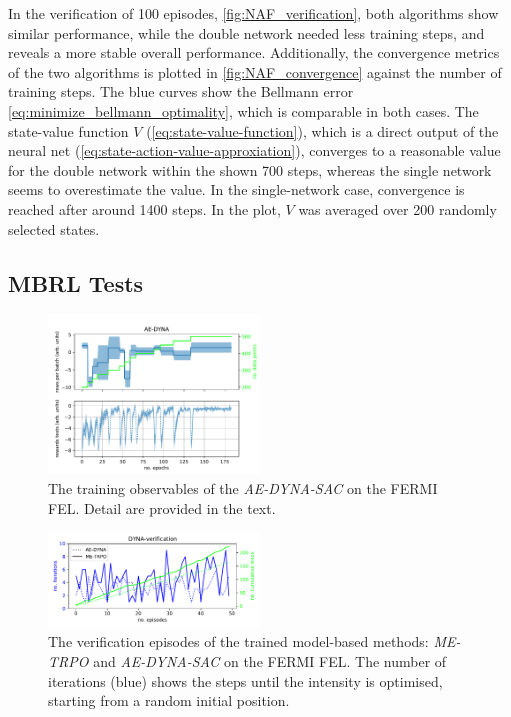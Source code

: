 \documentclass[
reprint,nofootinbib,
amsmath,amssymb,amsfonts,clevref,
aps,
prstab,
]{revtex4-2}
\begin{document}
	In the verification of 100 episodes, \cref{fig:NAF_verification}, both algorithms show similar performance, while the double network needed less training steps, and reveals a more stable overall performance. Additionally, the convergence metrics of the two algorithms is plotted in \cref{fig:NAF_convergence} against the number of training steps. The blue curves show the Bellmann error \cref{eq:minimize_bellmann_optimality}, which is comparable in both cases. The state-value function $V$ (\cref{eq:state-value-function}), which is a direct output of the neural net (\cref{eq:state-action-value-approxiation}), converges to a reasonable value for the double network within the shown 700 steps, whereas the single network seems to overestimate the value. In the single-network case, convergence is reached after around 1400 steps. In the plot, $V$ was averaged over 200 randomly selected states.
	\subsection{MBRL Tests}
	\begin{figure}
		\centering
		\includegraphics*[width=0.5\textwidth]{Figures/AE-DYNA_observables.pdf}
		\caption{The training observables of the \emph{AE-DYNA-SAC} on the FERMI FEL. Detail are provided in the text.}
		\label{fig:AE-DYNA_observables}
	\end{figure}
	
	\begin{figure}
		\centering
		\includegraphics*[width=0.5\textwidth]{Figures/Verification_DYNA_all_episodes.pdf}
		\caption{The verification episodes of the trained model-based methods: \emph{ME-TRPO} and \emph{AE-DYNA-SAC} on the FERMI FEL. The number of iterations (blue) shows the steps until the intensity is optimised, starting from a random initial position.}
		\label{fig:AE-DYNA_verification}
	\end{figure}
	
\end{document}
